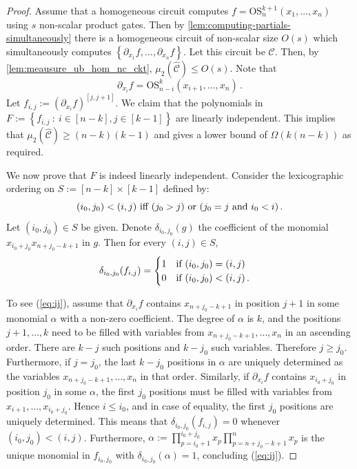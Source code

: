 \documentclass[10pt,a4paper]{article}
\def\set#1{\left\{ #1 \right\}}
\def\inbrace#1{\left\{ #1 \right\}}
\def\setdef#1#2{\inbrace{ #1 \ : \ #2}}      %
\newcommand{\ckt}{\textbf{$\mathcal{C}$}}
\newcommand{\esym}[2]{\mathrm{OS}_{#1}^{#2}}
\begin{document}
\begin{proof} 
  Assume that a homogeneous circuit computes $f = \esym{n}{k+1}(x_1,\dots,x_n)$ using $s$ non-scalar product gates.  
  Then by \autoref{lem:computing-partials-simultaneously} there is a homogeneous  circuit of non-scalar size $O(s)$ which simultaneously computes $\set{\partial_{x_1}f, \ldots, \partial_{x_{n}}f}$.
  Let this circuit be $\ckt$.
  Then, by \autoref{lem:meausure_ub_hom_nc_ckt}, $\mu_2(\widehat {\ckt}) \leq O(s)$. 
  Note that
  \[
    \partial_{x_i}f = \esym{n-i}{k}(x_{i+1}, \ldots, x_n)\,.
  \]
  Let $f_{i,j}:=(\partial_{x_i}f)^{[j,j+1]}$.  
  We claim that the polynomials in  $F:=\setdef{f_{i,j}}{i \in [n- k], j \in [k-1]}$ are linearly independent. 
  This implies  that $\mu_2(\widehat{\ckt}) \geq (n-k)(k-1)$ and gives a lower bound of $\Omega(k(n-k))$ as required.
  
  We now prove that $F$ is indeed linearly independent. Consider the lexicographic ordering on $S:=[n-k]\times [k-1]$ defined by: 
  \[( i_0, j_0) < (i,j) \hbox{ iff } (j_0 > 
  j) \hbox{ or } (j_0=j  \hbox{ and } i_0< i)\,.\] 
  Let $(i_0,j_0)\in S$ be given. 
  Denote $\delta_{i_0,j_0}(g)$ the coefficient of 
  the monomial $x_{i_0+j_0}x_{n+j_0-k+1}$ in $g$. Then for every $(i,j)\in S$, 
  \begin{equation}\label{eq:ij}
    \delta_{i_0,j_0}(f_{i,j}) =
    \begin{cases}
      1 \text{\quad if $(i_0,j_0) = (i,j)$}\,\\
      0 \text{\quad if $(i_0,j_0) < (i,j)$}\,.
    \end{cases}
  \end{equation}

  To see (\ref{eq:ij}), assume that $\partial_{x_i}f$ contains $x_{n+j_0-k+1}$ in position $j+1$ in some monomial $\alpha$ with a non-zero coefficient.  
  The degree of $\alpha$ is $k$, and the positions $j+1,\dots, k$  need to be filled with variables from $x_{n+j_0-k+1},\dots,x_n$ in an ascending order. 
  There are $k-j$ such positions and $k-j_0$ such variables. 
  Therefore $j\geq j_0$. 
  Furthermore, if $j=j_0$, the last $k-j_0$ positions in $\alpha$ are uniquely determined as the variables $x_{n+j_0-k+1},\dots,x_n$ in that order. 
  Similarly, if $\partial_{x_{i}}f$ contains $x_{i_0+j_0}$ in position $j_0$ in some $\alpha$, the first $j_0$ positions must be filled with variables from $x_{i+1},\dots, x_{i_0+j_0} $. 
  Hence $i\leq i_0$, and in case of equality, the first $j_0$ positions are uniquely determined. 
  This means that $ \delta_{i_0,j_0}(f_{i,j})=0$ whenever $(i_0,j_0) < (i,j)$. 
  Furthermore, $\alpha:=\prod_{p=i_0+1}^{i_0+ j_0}x_{p}\prod_{p= n+j_0-k+1}^n x_p$  is the unique monomial in $f_{i_0,j_0}$ with $\delta_{i_0,j_0}(\alpha)=1$, concluding (\ref{eq:ij}).   
   

\end{proof}
\end{document}
